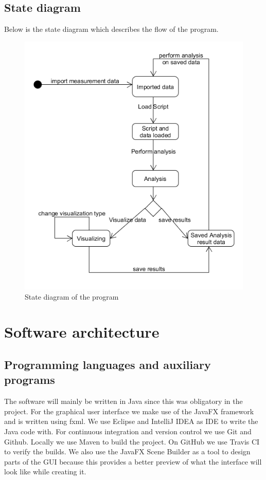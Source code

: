 \documentclass[a4paper]{article}
\begin{document}
\subsection{State diagram}
Below is the state diagram which describes the flow of the program.
\begin{figure}[h]
	\centering
	\includegraphics[scale=0.5]{images/statemachine.png}
	\caption{State diagram of the program}
	\label{fig:statemachine}
\end{figure}

\newpage

\section{Software architecture}

\subsection{Programming languages and auxiliary programs}
The software will mainly be written in Java since this was obligatory in
the project. For the graphical user interface we make use of the JavaFX
framework and is written using fxml. We use Eclipse and IntelliJ IDEA as IDE to
write the Java code with. 
For continuous integration and version control we use Git and Github. Locally we use Maven to build the project. On GitHub we use Travis CI to verify the builds.
We also use the JavaFX Scene Builder as a tool to design parts of the GUI because this provides a better preview of what the interface will look like while creating it.
\end{document}
